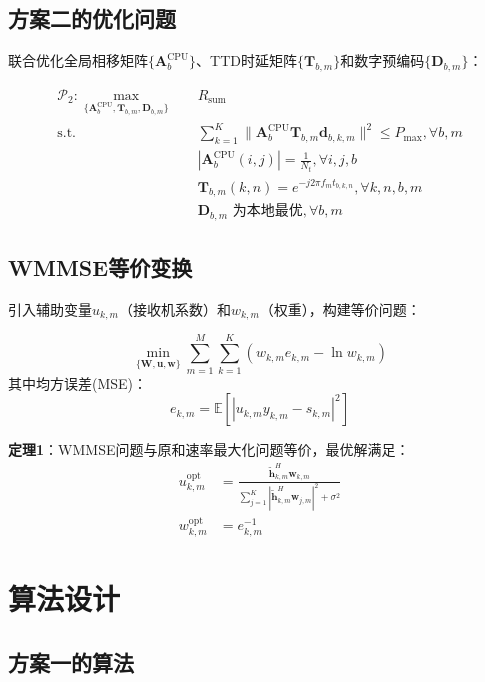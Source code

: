 \documentclass[10pt,twocolumn]{IEEEtran}
\newcommand{\vect}[1]{\mathbf{#1}}
\newcommand{\mat}[1]{\mathbf{#1}}
\begin{document}
\subsection{方案二的优化问题}

联合优化全局相移矩阵$\{\mat{A}_b^{\text{CPU}}\}$、TTD时延矩阵$\{\mat{T}_{b,m}\}$和数字预编码$\{\mat{D}_{b,m}\}$：

\begin{align}
\mathcal{P}_2: \max_{\{\mat{A}_b^{\text{CPU}}, \mat{T}_{b,m}, \mat{D}_{b,m}\}} \quad & R_{\text{sum}} \\
\text{s.t.} \quad & \sum_{k=1}^K \|\mat{A}_b^{\text{CPU}} \mat{T}_{b,m} \vect{d}_{b,k,m}\|^2 \leq P_{\text{max}}, \forall b, m \\
& |\mat{A}_b^{\text{CPU}}(i,j)| = \frac{1}{N_t}, \forall i, j, b \\
& \mat{T}_{b,m}(k,n) = e^{-j2\pi f_m t_{b,k,n}}, \forall k, n, b, m \\
& \mat{D}_{b,m} \text{ 为本地最优}, \forall b, m
\end{align}

\subsection{WMMSE等价变换}

引入辅助变量$u_{k,m}$（接收机系数）和$w_{k,m}$（权重），构建等价问题：

\begin{equation}
\min_{\{\vect{W}, \vect{u}, \vect{w}\}} \sum_{m=1}^M \sum_{k=1}^K (w_{k,m} e_{k,m} - \ln w_{k,m})
\end{equation}
其中均方误差(MSE)：
\begin{equation}
e_{k,m} = \mathbb{E}[|u_{k,m} y_{k,m} - s_{k,m}|^2]
\end{equation}

\textbf{定理1}：WMMSE问题与原和速率最大化问题等价，最优解满足：
\begin{align}
u_{k,m}^{\text{opt}} &= \frac{\tilde{\vect{h}}_{k,m}^H \vect{w}_{k,m}}{\sum_{j=1}^K |\tilde{\vect{h}}_{k,m}^H \vect{w}_{j,m}|^2 + \sigma^2} \\
w_{k,m}^{\text{opt}} &= e_{k,m}^{-1}
\end{align}

\section{算法设计}

\subsection{方案一的算法}
\end{document}
